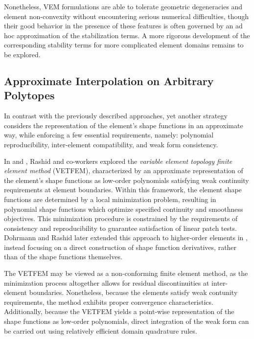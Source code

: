 		Nonetheless, VEM formulations are able to tolerate geometric degeneracies and element non-convexity without encountering serious numerical difficulties, though their good behavior in the presence of these features is often governed by an ad hoc approximation of the stabilization terms. A more rigorous development of the corresponding stability terms for more complicated element domains remains to be explored.
		
	\subsection{Approximate Interpolation on Arbitrary Polytopes}
		In contrast with the previously described approaches, yet another strategy considers the representation of the element's shape functions in an approximate way, while enforcing a few essential requirements, namely: polynomial reproducibility, inter-element compatibility, and weak form consistency.
		
		In \cite{Rashid:00} and \cite{Rashid:06}, Rashid and co-workers  explored the \textit{variable element topology finite element method} (VETFEM), characterized by an approximate representation of the element's shape functions as low-order polynomials satisfying weak continuity requirements at element boundaries. Within this framework, the element shape functions are determined by a local minimization problem, resulting in polynomial shape functions which optimize specified continuity and smoothness objectives. This minimization procedure is constrained by the requirements of consistency and reproducibility to guarantee satisfaction of linear patch tests. Dohrmann and Rashid later extended this approach to higher-order elements in \cite{Dohrmann:02}, instead focusing on a direct construction of shape function derivatives, rather than of the shape functions themselves.
		
		The VETFEM may be viewed as a non-conforming finite element method, as the minimization process altogether allows for residual discontinuities at inter-element boundaries. Nonetheless, because the elements satisfy weak contunity requirements, the method exhibits proper convergence characteristics. Additionally, because the VETFEM yields a point-wise representation of the shape functions as low-order polynomials, direct integration of the weak form can be carried out using relatively efficient domain quadrature rules.
			
